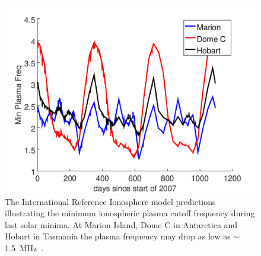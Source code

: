\begin{figure}
	\centering
	\includegraphics[width=\linewidth]{Figures/marion_domec_hobart}
	\caption{The International Reference Ionosphere model predictions illustrating the minimum ionospheric plasma cutoff frequency during last solar minima. At Marion Island, Dome C in Antarctica and Hobart in Tasmania the plasma frequency may drop as low as $\sim$\SI{1.5}{\mega\hertz}~\citep{2020arXiv200812208C}.}
	\label{fig:IRI_model}
\end{figure}
